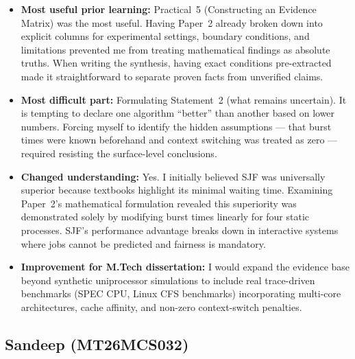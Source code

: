 \documentclass[11pt, a4paper]{article}
\begin{document}
\begin{itemize}[nosep]
    \item \textbf{Most useful prior learning:} Practical~5 (Constructing an Evidence Matrix) was the most useful. Having Paper~2 already broken down into explicit columns for experimental settings, boundary conditions, and limitations prevented me from treating mathematical findings as absolute truths. When writing the synthesis, having exact conditions pre-extracted made it straightforward to separate proven facts from unverified claims.

    \item \textbf{Most difficult part:} Formulating Statement~2 (what remains uncertain). It is tempting to declare one algorithm ``better'' than another based on lower numbers. Forcing myself to identify the hidden assumptions --- that burst times were known beforehand and context switching was treated as zero --- required resisting the surface-level conclusions.

    \item \textbf{Changed understanding:} Yes. I initially believed SJF was universally superior because textbooks highlight its minimal waiting time. Examining Paper~2's mathematical formulation revealed this superiority was demonstrated solely by modifying burst times linearly for four static processes. SJF's performance advantage breaks down in interactive systems where jobs cannot be predicted and fairness is mandatory.

    \item \textbf{Improvement for M.Tech dissertation:} I would expand the evidence base beyond synthetic uniprocessor simulations to include real trace-driven benchmarks (SPEC CPU, Linux CFS benchmarks) incorporating multi-core architectures, cache affinity, and non-zero context-switch penalties.
\end{itemize}

\subsection{Sandeep (MT26MCS032)}
\end{document}
